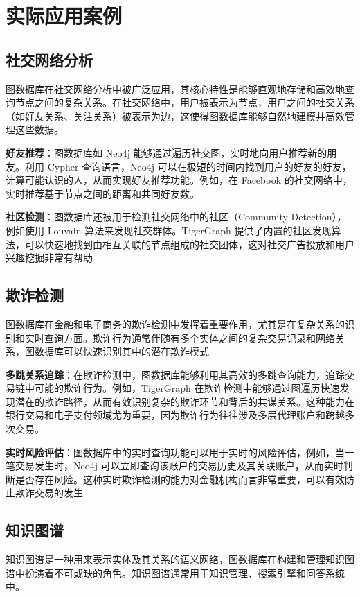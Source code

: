 \section{实际应用案例}

\subsection{社交网络分析}
图数据库在社交网络分析中被广泛应用，其核心特性是能够直观地存储和高效地查询节点之间的复杂关系。在社交网络中，用户被表示为节点，用户之间的社交关系（如好友关系、关注关系）被表示为边，这使得图数据库能够自然地建模并高效管理这些数据。

\textbf{好友推荐}：图数据库如 Neo4j 能够通过遍历社交图，实时地向用户推荐新的朋友。利用 Cypher 查询语言，Neo4j 可以在极短的时间内找到用户的好友的好友，计算可能认识的人，从而实现好友推荐功能。例如，在 Facebook 的社交网络中，实时推荐基于节点之间的距离和共同好友数\cite{ahmad2020missing,wang2022common}。

\textbf{社区检测}：图数据库还被用于检测社交网络中的社区（Community Detection），例如使用 Louvain 算法来发现社交群体。TigerGraph 提供了内置的社区发现算法，可以快速地找到由相互关联的节点组成的社交团体，这对社交广告投放和用户兴趣挖掘非常有帮助\cite{tsitseklis2020scalable,beis2015benchmarking}

\subsection{欺诈检测}
图数据库在金融和电子商务的欺诈检测中发挥着重要作用，尤其是在复杂关系的识别和实时查询方面。欺诈行为通常伴随有多个实体之间的复杂交易记录和网络关系，图数据库可以快速识别其中的潜在欺诈模式

\textbf{多跳关系追踪}：在欺诈检测中，图数据库能够利用其高效的多跳查询能力，追踪交易链中可能的欺诈行为。例如，TigerGraph 在欺诈检测中能够通过图遍历快速发现潜在的欺诈路径，从而有效识别复杂的欺诈环节和背后的共谋关系。这种能力在银行交易和电子支付领域尤为重要，因为欺诈行为往往涉及多层代理账户和跨越多次交易\cite{mao2022financial,cheng2020graph,li2022internet}。

\textbf{实时风险评估}：图数据库中的实时查询功能可以用于实时的风险评估，例如，当一笔交易发生时，Neo4j 可以立即查询该账户的交易历史及其关联账户，从而实时判断是否存在风险。这种实时欺诈检测的能力对金融机构而言非常重要，可以有效防止欺诈交易的发生

\subsection{知识图谱}
知识图谱是一种用来表示实体及其关系的语义网络，图数据库在构建和管理知识图谱中扮演着不可或缺的角色。知识图谱通常用于知识管理、搜索引擎和问答系统中\cite{黄恒琪2019知识图谱研究综述}。


